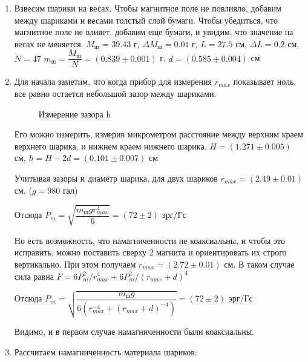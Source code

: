 \documentclass[a4paper, 12pt]{article}
\begin{document}
\begin{enumerate}
\item
Взвесим шарики на весах. Чтобы магнитное поле не повлияло, добавим между шариками и весами толстый слой бумаги. Чтобы убедиться, что магнитное поле не влияет, добавим еще бумаги, и увидим, что значение на весах не меняется.
$M_\text{ш}$ = 39.43 г, $\Delta M_\text{ш} = 0.01 $ г, $L = 27.5$ см, $\Delta L = 0.2$ см, $N = 47$
$m_\text{ш} = \dfrac{M_\text{ш}}{N} = (0.839\pm0.001)$ г, $d=(0.585\pm0.004)$ см
\item


Для начала заметим, что когда прибор для измерения $r_{max}$ показывает ноль, все равно остается небольшой зазор между шариками. 

\begin{figure}[h]
\caption{Измерение зазора h}
\label{ris:image}
\end{figure}
 Его можно измерить, измерив микрометром расстояние между верхним краем верхнего шарика, и нижнем краем нижнего шарика. $H = (1.271\pm0.005)$ см, $h = H - 2d = (0.101\pm0.007)$ см 

Учитывая зазоры и диаметр шарика, для двух шариков $r_{max} = (2.49\pm0.01)$ см. ($g=980$ гал)

Отсюда $P_m = \sqrt{\dfrac{m_\text{ш} g r_{max}^4}{6}} = (72\pm2)$ эрг/Гс

Но есть возможность, что намагниченности не коаксиальны, и чтобы это исправить, можно поставить сверху 2 магнита и ориентировать их строго вертикально. При этом получаем $r_{max} = (2.72\pm0.01)$  см. В таком случае сила равна $F = 6 P_{m}^{2} / r_{max}^{4} + 6 P_{m}^{2} /( r_{max}+d)^{4}$

Отсюда $P_m = \sqrt{\dfrac{m_\text{ш} g}{6(r_{max}^{-4}+( r_{max}+d)^{-4})}} = (72\pm2)$ эрг/Гс

Видимо, и в первом случае намагниченности были коаксиальны.
\item
Рассчитаем намагниченность материала шариков: 


\end{enumerate}
\end{document}
